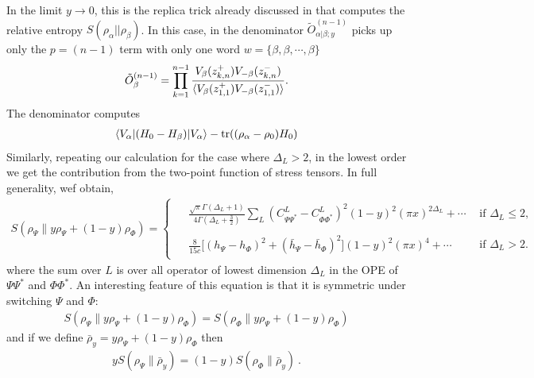 \documentclass[11pt]{article}
\newcommand{\tr}{\mathrm{tr}}
\newcommand{\lb}{\left(}
\newcommand{\rb}{\right)}
\begin{document}
In the limit $y\to 0$, this is the replica trick already discussed in \cite{Lashkari_2014} that computes the relative entropy $S(\rho_\alpha||\rho_\beta)$. In this case, in the denominator $\tilde{O}_{\alpha|\beta;y}^{(n-1)}$ picks up only the $p=(n-1)$ term with only one word $w=\{\beta,\beta,\cdots, \beta\}$
\begin{align}
  \tilde{O}_\beta^{(n-1)} = \prod_{k=1}^{n-1}\frac{V_{\beta}(z_{k,n}^{+})V_{-\beta}(z_{k,n}^{-})}{\braket{V_{\beta}(z^+_{1,1})V_{-\beta}(z^-_{1,1})}}.
\end{align}
The denominator computes 
\begin{align}
\braket{V_\alpha|(H_0-H_\beta)|V_\alpha}-\tr((\rho_\alpha-\rho_0)H_0)
\end{align}
Similarly, repeating our calculation for the case where $\Delta_L>2$, in the lowest order we get the contribution from the two-point function of stress tensors. In full generality, wef obtain, 
\begin{align}\label{smallxMixture}
\boxed{
S(\rho_\Psi\|y\rho_\Psi+(1-y)\rho_\Phi)
=
\begin{cases}
\begin{aligned}
&\frac{\sqrt{\pi}\Gamma(\Delta_L+1)}
{4\Gamma(\Delta_L+\frac32)}
\sum_L
(C^L_{\Psi\Psi^*}-C^L_{\Phi\Phi^*})^2
(1-y)^2(\pi x)^{2\Delta_L}
+\cdots
\end{aligned}
&
\text{if }\Delta_L\le 2,
\\[2ex]
\begin{aligned}
&\frac{8}{15c}
\Big[
(h_\Psi-h_\Phi)^2 
+(\bar h_\Psi-\bar h_\Phi)^2
\Big]
(1-y)^2(\pi x)^4
+\cdots
\end{aligned}
&
\text{if }\Delta_L>2 .
\end{cases}
}
\end{align}
where the sum over $L$ is over all operator of lowest dimension $\Delta_L$ in the OPE of $\Psi\Psi^*$ and $\Phi \Phi^*$.
An interesting feature of this equation is that it is symmetric under switching $\Psi$ and $\Phi$:
\begin{align}
S(\rho_\Psi\|y\rho_\Psi+(1-y)\rho_\Phi)=S(\rho_\Phi\|y\rho_\Psi+(1-y)\rho_\Phi)
\end{align}
and if we define $\bar{\rho}_y=y\rho_\Psi+(1-y)\rho_\Phi$ then
\begin{align}
    y S(\rho_\Psi\|\bar{\rho}_y)=(1-y) S(\rho_\Phi\|\bar{\rho}_y)\ .
\end{align}
\end{document}
